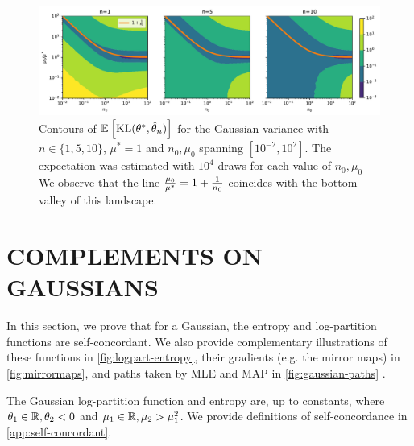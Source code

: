\documentclass[twoside]{article}
\newcommand*{\expect}[2][]{\ensuremath{\mathbb{E}_{#1} \left[ #2 \right] }} %
\newcommand{\logpart}{A}
\newcommand{\conj}{{\logpart^*}}
\newcommand{\nat}{\theta}
\newcommand{\m}{\mu}
\begin{document}
\begin{figure}[ht]
	\centering
	\includegraphics[width=\textwidth]{figs/optimal_n0.pdf}
	\caption{Contours of $\expect{\KL(\nat^*, \hat \nat_n)}$  for the Gaussian variance with $n\in\{1,5,10\}$, $\mu^*=1$ and $n_0, \mu_0$ spanning $[10^{-2}, 10^2]$. The expectation was estimated with $10^4$ draws for each value of $n_0, \mu_0$ We observe that the line $\frac{\mu_0}{\mu^*} = 1 + \frac{1}{n_0}$ coincides with the bottom valley of this landscape.
	}
	\label{fig:optimal_n0}
\end{figure}


\section{COMPLEMENTS ON GAUSSIANS}
\label{app:gaussian}


In this section, we prove that for a Gaussian, the entropy and log-partition functions are self-concordant.
We also provide complementary illustrations of 
these functions in \cref{fig:logpart-entropy}, 
their gradients (e.g. the mirror maps) in \cref{fig:mirrormaps},
and paths taken by MLE and MAP in \cref{fig:gaussian-paths} .

The Gaussian log-partition function and entropy are, up to constants,
\alignn{
	\logpart(\nat) &= \frac{\nat_1^2}{-4\nat_2} - \half \log(-\nat_2) \label{eq:app-logpart} \\
	\conj(\m) &= - \half \log (\mu_2 - \mu_1^2) \; , \label{eq:app-entropy}
}
where $\nat_1\in\real, \nat_2 <0$ and $\mu_1\in\mathbb{R}, \mu_2>\mu_1^2$.
We provide definitions of self-concordance in \cref{app:self-concordant}.
\end{document}
